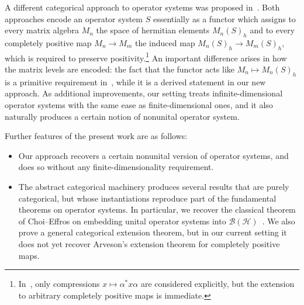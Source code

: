 \documentclass[11pt,onecolumn]{article}
\theoremstyle{plain}
\theoremstyle{remark}
\theoremstyle{definition}
\begin{document}
A different categorical approach to operator systems was proposed in~\cite{bos}.
Both approaches encode an operator system $S$ essentially as a functor which assigns to every matrix algebra $M_n$ the space of hermitian elements $M_n(S)_h$
and to every completely positive map $M_n \to M_m$ the induced map $M_n(S)_h \to M_m(S)_h$, which is required to preserve positivity.\footnote{In~\cite{bos}, only compressions $x \mapsto \alpha^* x \alpha$ are considered explicitly, but the extension to arbitrary completely positive maps is immediate.}
An important difference arises in how the matrix levels are encoded:
the fact that the functor acts like $M_n \mapsto M_n(S)_h$ is a primitive requirement in~\cite{bos},
while it is a derived statement in our new approach.
As additional improvements, our setting treats infinite-dimensional operator systems with the same ease as finite-dimensional ones,
and it also naturally produces a certain notion of nonunital operator system.

Further features of the present work are as follows: 
\begin{itemize}
	\item Our approach recovers a certain nonunital version of operator systems, and does so without any finite-dimensionality requirement.
	\item The abstract categorical machinery produces several results that are purely categorical,
		but whose instantiations reproduce part of the fundamental theorems on operator systems.
			In particular, we recover the classical theorem of Choi--Effros on embedding unital operator systems into $\mathcal{B}(\mathcal{H})$~\cite[Theorem~13.1]{Paulsen}.
		We also prove a general categorical extension theorem, but in our current setting it does not yet recover Arveson's extension theorem for completely positive maps.
\end{itemize}
\end{document}
